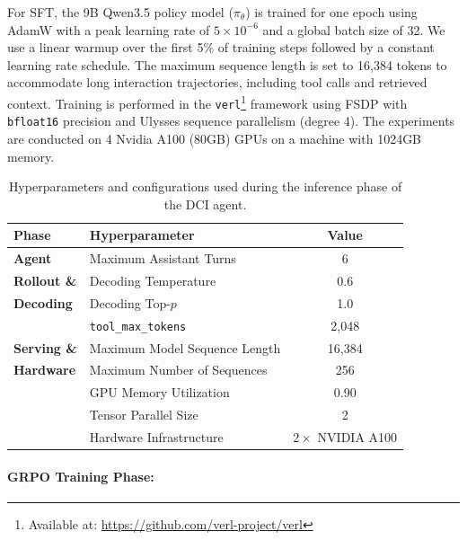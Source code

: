 \documentclass{llmxive}
\begin{document}
For SFT, the 9B Qwen3.5 policy model ($\pi_\theta$) is trained for one epoch using AdamW \citep{loshchilov2018decoupled} with a peak learning rate of $5 \times 10^{-6}$ and a global batch size of 32. We use a linear warmup over the first 5\% of training steps followed by a constant learning rate schedule. The maximum sequence length is set to 16,384 tokens to accommodate long interaction trajectories, including tool calls and retrieved context. Training is performed in the \texttt{verl}\footnote{Available at: \url{https://github.com/verl-project/verl}} framework using FSDP \citep{zhao2023pytorchfsdpexperiencesscaling} with \texttt{bfloat16} precision and Ulysses sequence parallelism (degree 4). The experiments are conducted on 4 Nvidia A100 (80GB) GPUs on a machine with 1024GB memory.

\begin{table}[!t]
\centering
\begin{tabular}{llc}
\toprule
\textbf{Phase} & \textbf{Hyperparameter} & \textbf{Value} \\
\midrule
\textbf{Agent} 
& Maximum Assistant Turns & 6 \\
\textbf{Rollout \&} 
& Decoding Temperature & 0.6 \\
\textbf{Decoding} 
& Decoding Top-$p$ & 1.0 \\
& \texttt{tool\_max\_tokens} & 2,048 \\
\midrule
\textbf{Serving \&} 
& Maximum Model Sequence Length & 16,384 \\
\textbf{Hardware} 
& Maximum Number of Sequences & 256 \\
& GPU Memory Utilization & 0.90 \\
& Tensor Parallel Size & 2 \\
& Hardware Infrastructure & $2\times$ NVIDIA A100 \\
\bottomrule
\end{tabular}
\caption{Hyperparameters and configurations used during the inference phase of the DCI agent.}
\label{tab:hyperparams-inference}
\end{table}




\paragraph{GRPO Training Phase:}
\end{document}
